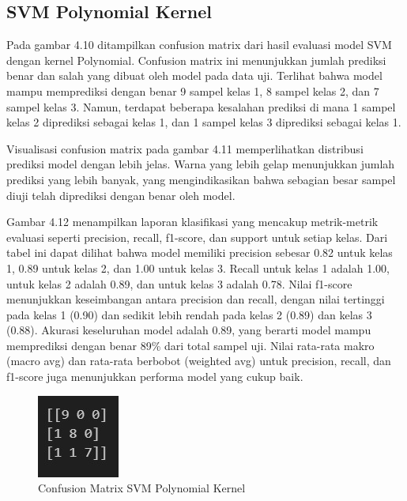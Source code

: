 \subsection{SVM Polynomial Kernel}
\label{sec:evalPolyKernel}


Pada gambar 4.10 ditampilkan confusion matrix dari hasil evaluasi model SVM dengan kernel Polynomial. Confusion matrix ini menunjukkan jumlah prediksi benar dan salah yang dibuat oleh model pada data uji. Terlihat bahwa model mampu memprediksi dengan benar 9 sampel kelas 1, 8 sampel kelas 2, dan 7 sampel kelas 3. Namun, terdapat beberapa kesalahan prediksi di mana 1 sampel kelas 2 diprediksi sebagai kelas 1, dan 1 sampel kelas 3 diprediksi sebagai kelas 1.

Visualisasi confusion matrix pada gambar 4.11 memperlihatkan distribusi prediksi model dengan lebih jelas. Warna yang lebih gelap menunjukkan jumlah prediksi yang lebih banyak, yang mengindikasikan bahwa sebagian besar sampel diuji telah diprediksi dengan benar oleh model.

Gambar 4.12 menampilkan laporan klasifikasi yang mencakup metrik-metrik evaluasi seperti precision, recall, f1-score, dan support untuk setiap kelas. Dari tabel ini dapat dilihat bahwa model memiliki precision sebesar 0.82 untuk kelas 1, 0.89 untuk kelas 2, dan 1.00 untuk kelas 3. Recall untuk kelas 1 adalah 1.00, untuk kelas 2 adalah 0.89, dan untuk kelas 3 adalah 0.78. Nilai f1-score menunjukkan keseimbangan antara precision dan recall, dengan nilai tertinggi pada kelas 1 (0.90) dan sedikit lebih rendah pada kelas 2 (0.89) dan kelas 3 (0.88). Akurasi keseluruhan model adalah 0.89, yang berarti model mampu memprediksi dengan benar 89\% dari total sampel uji. Nilai rata-rata makro (macro avg) dan rata-rata berbobot (weighted avg) untuk precision, recall, dan f1-score juga menunjukkan performa model yang cukup baik.

\begin{figure} [H] \centering
  \includegraphics[scale=1]{gambar/cfpoly.jpg}
  \caption{Confusion Matrix SVM Polynomial Kernel}
  \label{fig:evalcfpolykernel}
\end{figure}

